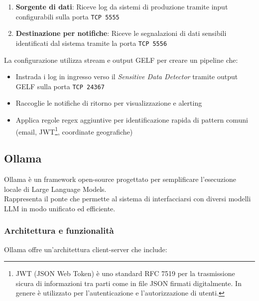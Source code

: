 \documentclass[12pt]{report}
\begin{document}
\begin{enumerate}
    \item \textbf{Sorgente di dati}: Riceve log da sistemi di produzione tramite input configurabili sulla porta \texttt{TCP 5555}
    \item \textbf{Destinazione per notifiche}: Riceve le segnalazioni di dati sensibili identificati dal sistema tramite la porta \texttt{TCP 5556}
\end{enumerate}

La configurazione utilizza stream e output GELF per creare un pipeline che:
\begin{itemize}
    \item Instrada i log in ingresso verso il \textit{Sensitive Data Detector} tramite output GELF sulla porta \texttt{TCP 24367}
    \item Raccoglie le notifiche di ritorno per visualizzazione e alerting
    \item Applica regole regex aggiuntive per identificazione rapida di pattern comuni (email, JWT\footnote{JWT (JSON Web Token) è uno standard RFC 7519 per la trasmissione sicura di informazioni tra parti come in file JSON firmati digitalmente. In genere è utilizzato per l'autenticazione e l'autorizzazione di utenti.}, coordinate geografiche)
\end{itemize}

\subsection{Ollama}
\label{subsec:ollama}

Ollama è un framework open-source progettato per semplificare l'esecuzione locale di Large Language Models.\\
Rappresenta il ponte che permette al sistema di interfacciarsi con diversi modelli LLM in modo unificato ed efficiente.

\subsubsection{Architettura e funzionalità}
Ollama offre un'architettura client-server che include:
\end{document}
